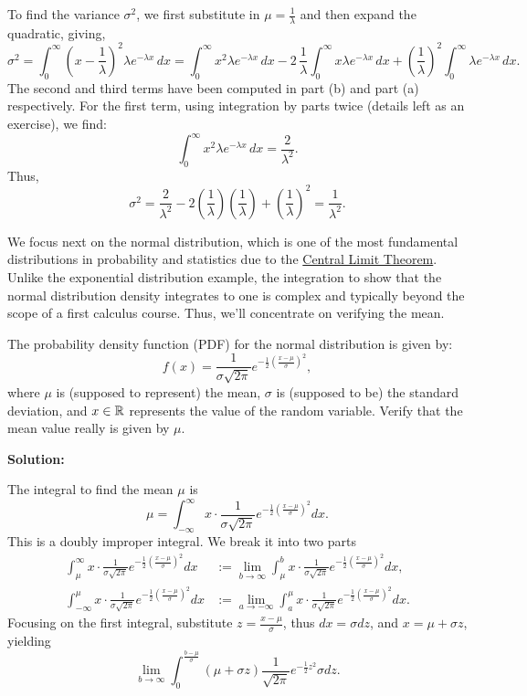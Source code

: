 \begin{enumerate}
To find the variance $\sigma^2$, we first substitute in $\mu = \frac{1}{\lambda}$ and then expand the quadratic, giving, 
\[ \sigma^2 = \int_0^\infty (x - \frac{1}{\lambda})^2  \lambda e^{-\lambda x}  \, dx = \int_0^\infty x^2 \lambda e^{-\lambda x} \, dx - 2\, \frac{1}{\lambda} \int_0^\infty x \lambda e^{-\lambda x} \, dx + \left(\frac{1}{\lambda} \right)^2 \int_0^\infty \lambda e^{-\lambda x} \, dx. \]
The second and third terms have been computed in part (b) and part (a) respectively. For the first term, using integration by parts twice (details left as an exercise), we find:
\[ \int_0^\infty x^2 \lambda e^{-\lambda x} \, dx = \frac{2}{\lambda^2}. \]
Thus,
\[ \sigma^2 = \frac{2}{\lambda^2} - 2\left(\frac{1}{\lambda}\right)\left(\frac{1}{\lambda}\right) + \left(\frac{1}{\lambda}\right)^2 = \frac{1}{\lambda^2}. \]
\end{enumerate}

\Qed
\bigskip

We focus next on the normal distribution, which is one of the most fundamental distributions in probability and statistics due to the \href{https://en.wikipedia.org/wiki/Central_limit_theorem}{Central Limit Theorem}. Unlike the exponential distribution example, the integration to show that the normal distribution density integrates to one is complex and typically beyond the scope of a first calculus course. Thus, we'll concentrate on verifying the mean.

\begin{example}
The probability density function (PDF) for the normal distribution is given by:
\[ f(x) = \frac{1}{\sigma\sqrt{2\pi}} e^{-\frac{1}{2}\left(\frac{x-\mu}{\sigma}\right)^2}, \]
where \(\mu\) is (supposed to represent) the mean, \(\sigma\) is (supposed to be) the standard deviation, and \(x \in \mathbb R\) represents the value of the random variable. Verify that the mean value really is given by $\mu$.
\end{example}

\textbf{Solution:} 

The integral to find the mean $\mu$ is
\[ \mu =\int_{-\infty}^{\infty} x \cdot \frac{1}{\sigma\sqrt{2\pi}} e^{-\frac{1}{2}\left(\frac{x-\mu}{\sigma}\right)^2} dx. \]
This is a doubly improper integral. We break it into two parts
\begin{align*}
    \int_{\mu}^{\infty} x \cdot \frac{1}{\sigma\sqrt{2\pi}} e^{-\frac{1}{2}\left(\frac{x-\mu}{\sigma}\right)^2} dx &:= \lim_{b \to \infty} \int_{\mu}^{b} x \cdot \frac{1}{\sigma\sqrt{2\pi}} e^{-\frac{1}{2}\left(\frac{x-\mu}{\sigma}\right)^2} dx, \\
     \int_{-\infty}^{\mu} x \cdot \frac{1}{\sigma\sqrt{2\pi}} e^{-\frac{1}{2}\left(\frac{x-\mu}{\sigma}\right)^2} dx &:= \lim_{a \to -\infty} \int_{a}^{\mu} x \cdot \frac{1}{\sigma\sqrt{2\pi}} e^{-\frac{1}{2}\left(\frac{x-\mu}{\sigma}\right)^2} dx.
\end{align*}
Focusing on the first integral, substitute $z = \frac{x-\mu}{\sigma}$, thus $dx = \sigma dz$, and $x = \mu + \sigma z$, yielding
\[ \lim_{b \to \infty} \int_{0}^{\frac{b-\mu}{\sigma}} (\mu + \sigma z) \frac{1}{\sqrt{2\pi}} e^{-\frac{1}{2}z^2} \sigma dz. \]

